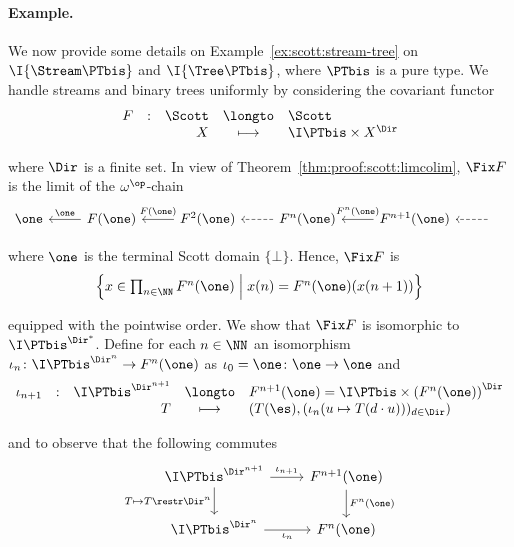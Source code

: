 \paragraph{Example.}
We now provide some details on Example~\ref{ex:scott:stream-tree}
on $\I{\Stream\PTbis}$ and $\I{\Tree\PTbis}$,
where $\PTbis$ is a pure type.
We handle streams and binary trees
uniformly by considering the covariant functor
\[
\begin{array}{l l r c l}
  F
& :
& \Scott
& \longto
& \Scott
\\

&
& X
& \longmapsto
& \I\PTbis \times X^\Dir
\end{array}
\]

\noindent
where $\Dir$ is a finite set.
In view of Theorem~\ref{thm:proof:scott:limcolim},
$\Fix F$ is the limit of the $\omega^\op$-chain
\[
\begin{tikzcd} %
  \one
& F(\one)
  \arrow{l}[above]{\one}
& F^2(\one)
  \arrow{l}[above]{F(\one)}
& F^n(\one)
  \arrow[dashed]{l}
& F^{n+1}(\one)
  \arrow{l}[above]{F^n(\one)}
& \phantom{F}
  \arrow[dashed]{l}
\end{tikzcd}
\]

\noindent
where $\one$ is the terminal Scott domain $\{\bot\}$.
Hence, $\Fix F$ is
\[
\begin{array}{c}
  \left\{
  x \in \prod_{n \in \NN} F^n(\one)
  \mathrel{\Big|}
  x(n) = F^n(\one)(x(n+1))
  \right\}
\end{array}
\]

\noindent
equipped with the pointwise order.
We show that $\Fix F$ is isomorphic to $\I\PTbis^{\Dir^*}$.
Define for each $n \in \NN$ an
isomorphism $\iota_n \colon \I\PTbis^{\Dir^n} \to F^n(\one)$
as $\iota_0 = \one \colon \one \to \one$
and
\[
\begin{array}{l l r c l}
  \iota_{n+1}
& :
& \I\PTbis^{\Dir^{n+1}}
& \longto
& F^{n+1}(\one) = \I\PTbis \times \left( F^n(\one) \right)^\Dir
\\

&
& T
& \longmapsto
& \left( T(\es), (\iota_n(u \mapsto T(d \cdot u)))_{d \in \Dir}  \right)
\end{array}
\]

\noindent
and to observe that the following commutes
\[
\begin{tikzcd}
  \I\PTbis^{\Dir^{n+1}}
  \arrow{d}[left]{T \mapsto T\restr \Dir^n}
  \arrow{r}{\iota_{n+1}}
& F^{n+1}(\one)
  \arrow{d}{F^n(\one)}
\\
  \I\PTbis^{\Dir^{n}}
  \arrow{r}[below]{\iota_{n}}
& F^n(\one)
\end{tikzcd}
\]

